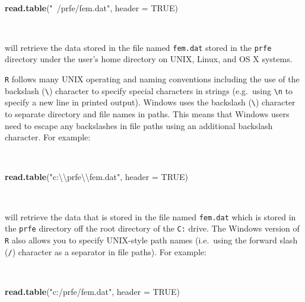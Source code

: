\documentclass[12pt,a4paper]{book}
\newenvironment{Shaded}{\begin{snugshade}}{\end{snugshade}}
\newcommand{\KeywordTok}[1]{\textcolor[rgb]{0.13,0.29,0.53}{\textbf{#1}}}
\newcommand{\DataTypeTok}[1]{\textcolor[rgb]{0.13,0.29,0.53}{#1}}
\newcommand{\CharTok}[1]{\textcolor[rgb]{0.31,0.60,0.02}{#1}}
\newcommand{\StringTok}[1]{\textcolor[rgb]{0.31,0.60,0.02}{#1}}
\newcommand{\OtherTok}[1]{\textcolor[rgb]{0.56,0.35,0.01}{#1}}
\newcommand{\NormalTok}[1]{#1}
\theoremstyle{definition}
\theoremstyle{definition}
\theoremstyle{definition}
\theoremstyle{remark}
\begin{document}
~

\begin{Shaded}
\begin{Highlighting}[]
\KeywordTok{read.table}\NormalTok{(}\StringTok{"~/prfe/fem.dat"}\NormalTok{, }\DataTypeTok{header =} \OtherTok{TRUE}\NormalTok{)}
\end{Highlighting}
\end{Shaded}

~

will retrieve the data stored in the file named \texttt{fem.dat} stored
in the \texttt{prfe} directory under the user's home directory on UNIX,
Linux, and OS X systems.

\texttt{R} follows many UNIX operating and naming conventions including
the use of the backslash (\texttt{\textbackslash{}}) character to
specify special characters in strings (e.g.~using
\texttt{\textbackslash{}n} to specify a new line in printed output).
Windows uses the backslash (\texttt{\textbackslash{}}) character to
separate directory and file names in paths. This means that Windows
users need to escape any backslashes in file paths using an additional
backslash character. For example:

~

\begin{Shaded}
\begin{Highlighting}[]
\KeywordTok{read.table}\NormalTok{(}\StringTok{"c:}\CharTok{\textbackslash{}\textbackslash{}}\StringTok{prfe}\CharTok{\textbackslash{}\textbackslash{}}\StringTok{fem.dat"}\NormalTok{, }\DataTypeTok{header =} \OtherTok{TRUE}\NormalTok{)}
\end{Highlighting}
\end{Shaded}

~

will retrieve the data that is stored in the file named \texttt{fem.dat}
which is stored in the \texttt{prfe} directory off the root directory of
the \texttt{C:} drive. The Windows version of \texttt{R} also allows you
to specify UNIX-style path names (i.e.~using the forward slash
(\texttt{/}) character as a separator in file paths). For example:

~

\begin{Shaded}
\begin{Highlighting}[]
\KeywordTok{read.table}\NormalTok{(}\StringTok{"c:/prfe/fem.dat"}\NormalTok{, }\DataTypeTok{header =} \OtherTok{TRUE}\NormalTok{)}
\end{Highlighting}
\end{Shaded}
\end{document}
